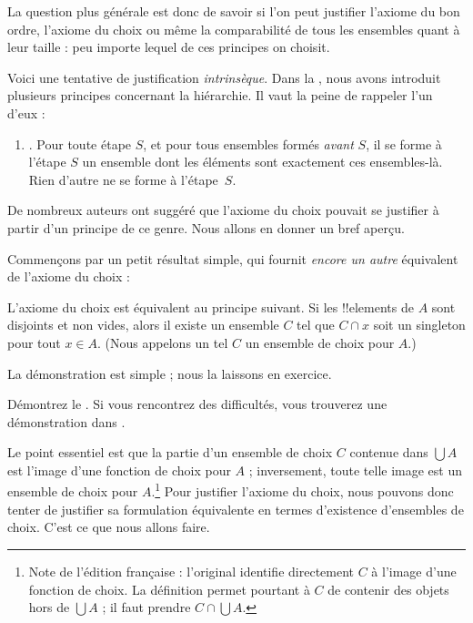 \documentclass[../../../include/open-logic-section]{subfiles}
\begin{document}

La question plus générale est donc de savoir
si l'on peut justifier l'axiome du bon ordre,
l'axiome du choix ou même la comparabilité
de tous les ensembles quant à leur taille :
peu importe lequel de ces principes
on choisit.

Voici une tentative de justification
\emph{intrinsèque}. Dans la
, nous avons
introduit plusieurs principes concernant
la hiérarchie. Il vaut la peine de
rappeler l'un d'eux :
\begin{enumerate}
	\item[] \stagesacc. Pour toute étape $S$,
	et pour tous ensembles formés
	\emph{avant} $S$, il se forme à l'étape
	$S$ un ensemble dont les éléments
	sont exactement ces ensembles-là.
	Rien d'autre ne se forme à
	l'étape~$S$.
\end{enumerate}
De nombreux auteurs ont suggéré que
l'axiome du choix pouvait se justifier
à partir d'un principe de ce genre.
Nous allons en donner un bref aperçu.

Commençons par un petit résultat simple,
qui fournit \emph{encore un autre}
équivalent de l'axiome du choix :

\begin{thm}[dans $\ZF$]
L'axiome du choix est équivalent au
principe suivant. Si les !!{element}s
de $A$ sont disjoints et non vides,
alors il existe un ensemble $C$
tel que $C \cap x$ soit un singleton
pour tout $x \in A$. (Nous appelons
un tel $C$ un {ensemble de choix}
pour $A$.)
\end{thm}

La démonstration est simple ; nous
la laissons en exercice.

\begin{prob}
Démontrez le
.
Si vous rencontrez des difficultés,
vous trouverez une démonstration dans
\cite[pp.~242--3]{Potter2004}.
\end{prob}

Le point essentiel est que la partie
d'un ensemble de choix $C$ contenue
dans $\bigcup A$ est l'image d'une
fonction de choix pour $A$ ; inversement,
toute telle image est un ensemble de
choix pour $A$.\footnote{Note de l'édition
française : l'original identifie directement
$C$ à l'image d'une fonction de choix.
La définition permet pourtant à $C$
de contenir des objets hors de
$\bigcup A$ ; il faut prendre
$C\cap\bigcup A$.}
Pour justifier l'axiome du choix,
nous pouvons donc tenter de justifier
sa formulation équivalente en termes
d'existence d'ensembles de choix.
C'est ce que nous allons faire.
\end{document}
